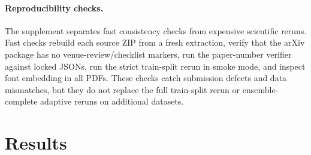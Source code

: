 \documentclass{article}
\begin{document}
\paragraph{Reproducibility checks.}
The supplement separates fast consistency checks from expensive scientific reruns. Fast checks rebuild each source ZIP from a fresh extraction, verify that the arXiv package has no venue-review/checklist markers, run the paper-number verifier against locked JSONs, run the strict train-split rerun in smoke mode, and inspect font embedding in all PDFs. These checks catch submission defects and data mismatches, but they do not replace the full train-split rerun or ensemble-complete adaptive reruns on additional datasets.

\section{Results}
\end{document}
